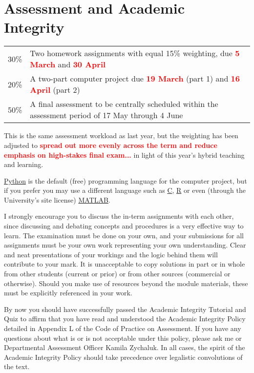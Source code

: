 \documentclass[12 pt]{article}
\newcommand{\mutesection}[1]{\vspace{-\medskipamount}\section*{#1}\vspace{-\medskipamount}}
\newcommand{\TODO}[1]{\textcolor{red}{\textbf{#1}}}
\begin{document}
{%
\mutesection{Assessment and Academic Integrity}
\begin{tabular}{ll}
  30\% & Two homework assignments with equal 15\% weighting, due \TODO{5 March} and \TODO{30 April} \\ %
  20\% & A two-part computer project due \TODO{19 March} (part 1) and \TODO{16 April} (part 2) \\
  50\% & A final assessment to be centrally scheduled within the assessment period of 17 May through 4 June \\
\end{tabular}

This is the same assessment workload as last year, but the weighting has been adjusted to \TODO{spread out more evenly across the term and reduce emphasis on high-stakes final exam...}
in light of this year's hybrid teaching and learning.



\href{https://www.python.org}{Python} is the default (free) programming language for the computer project, but if you prefer you may use a different language such as \href{https://en.wikipedia.org/wiki/C_(programming_language)}{C}, \href{https://www.r-project.org}{R} or even (through the University's site license) \href{https://matlab.mathworks.com}{MATLAB}.

I strongly encourage you to discuss the in-term assignments with each other, since discussing and debating concepts and procedures is a very effective way to learn.
The examination must be done on your own, and your submissions for all assignments must be your own work representing your own understanding.
Clear and neat presentations of your workings and the logic behind them will contribute to your mark.
It is unacceptable to copy solutions in part or in whole from other students (current or prior) or from other sources (commercial or otherwise).
Should you make use of resources beyond the module materials, these must be explicitly referenced in your work.

By now you should have successfully passed the Academic Integrity Tutorial and Quiz to affirm that you have read and understood the Academic Integrity Policy detailed in Appendix L of the Code of Practice on Assessment.
If you have any questions about what is or is not acceptable under this policy, please ask me or Departmental Assessment Officer Kamila Zychaluk.
In all cases, the spirit of the Academic Integrity Policy should take precedence over legalistic convolutions of the text.


}
\end{document}
